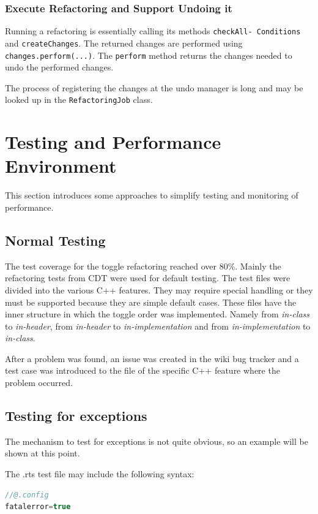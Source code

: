 \subsubsection{Execute Refactoring and Support Undoing it}
Running a refactoring is essentially calling its methods 
\texttt{checkAll- Conditions} and \texttt{createChanges}. The returned 
changes are performed using \texttt{changes.perform(...)}. The 
\texttt{perform} method returns the changes needed to undo the performed 
changes.

The process of registering the changes at the undo manager is long and may be 
looked up in the \texttt{RefactoringJob} class.


\section{Testing and Performance Environment}

This section introduces some approaches to simplify testing and monitoring of 
performance.

\subsection{Normal Testing}

The test coverage for the toggle refactoring reached over 80\%. Mainly the
refactoring tests from CDT were used for default testing. The test files were
divided into the various C++ features. They may require special handling or they
must be supported because they are simple default cases. These files have the
inner structure in which the toggle order was implemented. Namely from
\textit{in-class} to \textit{in-header}, from \textit{in-header} to
\textit{in-implementation} and from \textit{in-implementation} to
\textit{in-class}.

After a problem was found, an issue was created in the wiki bug tracker and a
test case was introduced to the file of the specific C++ feature where the
problem occurred.

\subsection{Testing for exceptions}
The mechanism to test for exceptions is not quite obvious, so an example will be
shown at this point. 

The .rts test file may include the following syntax:

\begin{lstlisting}[caption={Syntax to set variables inside a .rts file},
language=java]
//@.config
fatalerror=true
\end{lstlisting}

